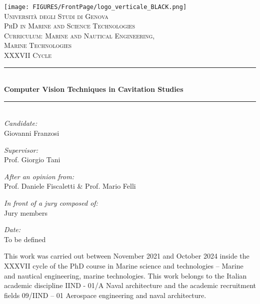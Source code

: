 \documentclass[10pt,b5paper,twoside]{book}
\begin{document}
\frontmatter
\begin{titlepage}
    \vspace{1cm}
    \begin{center}
        \texttt{[image: FIGURES/FrontPage/logo\_verticale\_BLACK.png]}\\[1cm]
        \textsc{\LARGE Università degli Studi di Genova}\\[1.5cm]
        
        \textsc{\Large PhD in Marine and Science Technologies} \\[0.5cm]
        \textsc{\large Curriculum: Marine and Nautical Engineering,} \\[0.25cm]
        \textsc{\large Marine Technologies} \\[0.5cm]
        \textsc{\Large XXXVII Cycle}
        \vspace{0.5cm}

        \rule{\linewidth}{0.5mm} \\[0.4cm]
        { \Large \bfseries Computer Vision Techniques in Cavitation Studies}\\[0.2cm]
        \rule{\linewidth}{0.5mm} \\[1cm]

        \large
        \emph{Candidate:}\\
        Giovanni Franzosi
        \vfill

        \large
        \emph{Supervisor:}\\
        Prof. Giorgio Tani
        \vfill

        \large
        \emph{After an opinion from:}\\
        Prof. Daniele Fiscaletti \& Prof. Mario Felli
        \vfill

        \large
        \emph{In front of a jury composed of:}\\
        Jury members
        \vfill

        \large
        \emph{Date:}\\
        To be defined
        \vfill
    \end{center}
\end{titlepage}

\newpage
\clearpage
\null
\thispagestyle{empty}
\clearpage

\newpage
\clearpage
\null
\thispagestyle{empty}
\begin{centering}
\vspace*{\fill}
This work was carried out between November 2021 and October 2024 inside the XXXVII cycle of the PhD course in Marine science and technologies – Marine and nautical engineering, marine technologies. 
This work belongs to the Italian academic discipline IIND - 01/A Naval architecture and the academic recruitment fields 09/IIND – 01 Aerospace engineering and naval architecture. 
\vspace*{\fill}
\end{centering}
\clearpage
\end{document}
